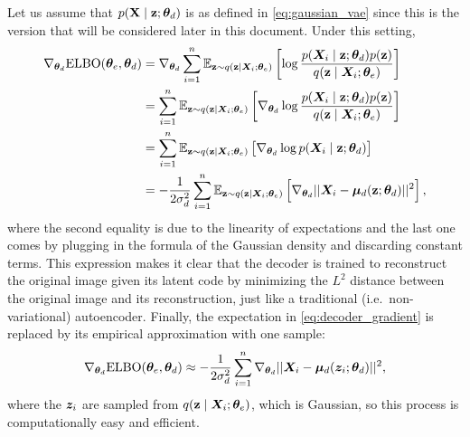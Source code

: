 Let us assume that $p({\mathbf{X}} \mid {\mathbf{z}}; {\bm{\theta}}_d)$ is as defined in \eqref{eq:gaussian_vae} since this is the version that will be considered later in this document. Under this setting,
\begin{align}
    \nabla_{{\bm{\theta}}_d} \mathrm{ELBO}({\bm{\theta}}_e, {\bm{\theta}}_d) &= \nabla_{{\bm{\theta}}_d} \sum_{i=1}^n \mathbb{E}_{{\mathbf{z}} \sim q({\mathbf{z}} \mid {\bm{X}}_i; {\bm{\theta}}_e)} \left[\log \frac{p({\bm{X}}_i \mid {\mathbf{z}}; {\bm{\theta}}_d)p({\mathbf{z}})}{q({\mathbf{z}} \mid {\bm{X}}_i; {\bm{\theta}}_e)} \right] \nonumber\\
    &= \sum_{i=1}^n \mathbb{E}_{{\mathbf{z}} \sim q({\mathbf{z}} \mid {\bm{X}}_i; {\bm{\theta}}_e)} \left[\nabla_{{\bm{\theta}}_d} \log \frac{p({\bm{X}}_i \mid {\mathbf{z}}; {\bm{\theta}}_d)p({\mathbf{z}})}{q({\mathbf{z}} \mid {\bm{X}}_i; {\bm{\theta}}_e)} \right] \nonumber\\
    &= \sum_{i=1}^n \mathbb{E}_{{\mathbf{z}} \sim q({\mathbf{z}} \mid {\bm{X}}_i; {\bm{\theta}}_e)} \left[ \nabla_{{\bm{\theta}}_d} \log p({\bm{X}}_i \mid {\mathbf{z}}; {\bm{\theta}}_d) \right] \nonumber\\
    &= -\frac{1}{2\sigma_d^2}\sum_{i=1}^n \mathbb{E}_{{\mathbf{z}} \sim q({\mathbf{z}} \mid {\bm{X}}_i; {\bm{\theta}}_e)} \left[ \nabla_{{\bm{\theta}}_d} ||{\bm{X}}_i - {\bm{\mu}}_d({\mathbf{z}}; {\bm{\theta}}_d)||^2  \right], \label{eq:decoder_gradient}
\end{align}
where the second equality is due to the linearity of expectations and the last one comes by plugging in the formula of the Gaussian density and discarding constant terms. This expression makes it clear that the decoder is trained to reconstruct the original image given its latent code by minimizing the $L^2$ distance between the original image and its reconstruction, just like a traditional (i.e.\ non-variational) autoencoder. Finally, the expectation in \eqref{eq:decoder_gradient} is replaced by its empirical approximation with one sample:
\begin{align}
    \nabla_{{\bm{\theta}}_d} \mathrm{ELBO}({\bm{\theta}}_e, {\bm{\theta}}_d) \approx -\frac{1}{2\sigma_d^2} \sum_{i=1}^n \nabla_{{\bm{\theta}}_d} ||{\bm{X}}_i - {\bm{\mu}}_d({\bm{z}}_i; {\bm{\theta}}_d)||^2,
\end{align}
where the ${\bm{z}}_i$ are sampled from $q({\mathbf{z}} \mid {\bm{X}}_i; {\bm{\theta}}_e)$, which is Gaussian, so this process is computationally easy and efficient.

